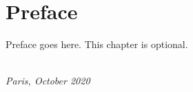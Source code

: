 \chapter*{Preface}

Preface goes here. This chapter is optional.

\begin{flushright}
{\makeatletter\itshape
    \@firstname\ \@lastname \\
    Paris, October 2020
\makeatother}
\end{flushright}

